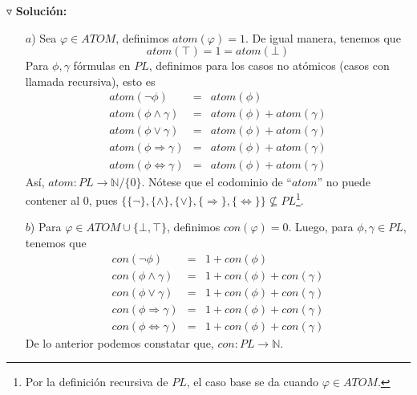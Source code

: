 \documentclass{article}
\begin{document}
\begin{enumerate}
  $\triangledown$ \textbf{Solución:}
  \begin{itemize}
  \item[$a$)] Sea $\varphi \in ATOM$, definimos $atom(\varphi) = 1$. De igual manera,
    tenemos que
    \[
    atom(\top) = 1 = atom(\bot)
    \]
    Para $\phi, \gamma$ fórmulas en $PL$, definimos para los casos no atómicos (casos con
    llamada recursiva), esto es
    \begin{eqnarray*}
      atom(\neg \phi) &=& atom(\phi)\\
      atom(\phi \land \gamma) &=& atom(\phi) + atom(\gamma)\\
      atom(\phi \lor \gamma) &=& atom(\phi) + atom(\gamma)\\
      atom(\phi \Rightarrow \gamma) &=& atom(\phi) + atom(\gamma)\\
      atom(\phi \Leftrightarrow \gamma) &=& atom(\phi) + atom(\gamma)
    \end{eqnarray*}
    Así, $atom: PL \rightarrow \mathbb{N}/\{0\}$. Nótese que el codominio de ``$atom$'' no puede
    contener al $0$, pues $\{\{\neg\}, \{\land\}, \{\lor\}, \{\Rightarrow\}, \{\Leftrightarrow\}\}
    \nsubseteq PL$\footnote{Por la definición recursiva de $PL$, el caso base se da cuando $\varphi
    \in ATOM$.}.
  \item[$b$)] Para $\varphi \in ATOM \cup \{\bot, \top\}$, definimos $con(\varphi) = 0$. Luego, para
    $\phi, \gamma \in PL$, tenemos que
    \begin{eqnarray*}
      con(\neg \phi) &=& 1 + con(\phi)\\
      con(\phi \land \gamma) &=& 1 + con(\phi) + con(\gamma)\\
      con(\phi \lor \gamma) &=& 1 + con(\phi) + con(\gamma)\\
      con(\phi \Rightarrow \gamma) &=& 1 + con(\phi) + con(\gamma)\\
      con(\phi \Leftrightarrow \gamma) &=& 1 + con(\phi) + con(\gamma)
    \end{eqnarray*}
    De lo anterior podemos constatar que, $con: PL \rightarrow \mathbb{N}$.
    

\end{itemize}
\end{enumerate}
\end{document}
